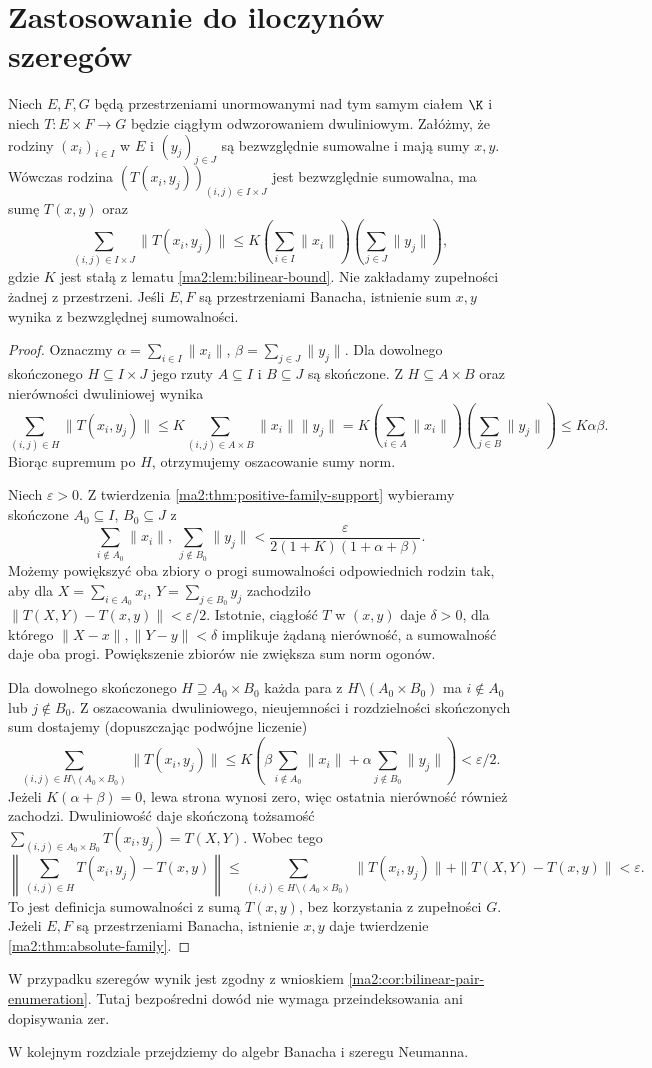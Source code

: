 \section{Zastosowanie do iloczynów szeregów}

\begin{twierdzenie}
\label{ma2:thm:bilinear-family-product}
Niech $E,F,G$ będą przestrzeniami unormowanymi nad
tym samym ciałem $\K$ i niech $T:E\times F\to G$
będzie ciągłym odwzorowaniem dwuliniowym. Załóżmy,
że rodziny $(x_i)_{i\in I}$ w $E$ i $(y_j)_{j\in J}$
są bezwzględnie sumowalne i mają sumy $x,y$.
Wówczas rodzina $(T(x_i,y_j))_{(i,j)\in I\times J}$
jest bezwzględnie sumowalna, ma sumę $T(x,y)$ oraz
\[
 \sum_{(i,j)\in I\times J}\|T(x_i,y_j)\|
 \le K\left(\sum_{i\in I}\|x_i\|\right)
       \left(\sum_{j\in J}\|y_j\|\right),
\]
gdzie $K$ jest stałą z lematu \ref{ma2:lem:bilinear-bound}.
Nie zakładamy zupełności żadnej z przestrzeni.
Jeśli $E,F$ są przestrzeniami Banacha, istnienie sum
$x,y$ wynika z bezwzględnej sumowalności.
\end{twierdzenie}
\begin{proof}
Oznaczmy $\alpha=\sum_{i\in I}\|x_i\|$,
$\beta=\sum_{j\in J}\|y_j\|$.
Dla dowolnego skończonego $H\subseteq I\times J$
jego rzuty $A\subseteq I$ i $B\subseteq J$ są skończone.
Z $H\subseteq A\times B$ oraz nierówności dwuliniowej
wynika
\[
 \sum_{(i,j)\in H}\|T(x_i,y_j)\|
 \le K\sum_{(i,j)\in A\times B}\|x_i\|\|y_j\|
 =K\left(\sum_{i\in A}\|x_i\|\right)
    \left(\sum_{j\in B}\|y_j\|\right)
 \le K\alpha\beta.
\]
Biorąc supremum po $H$, otrzymujemy oszacowanie
sumy norm.

Niech $\varepsilon>0$. Z twierdzenia
\ref{ma2:thm:positive-family-support} wybieramy
skończone $A_0\subseteq I$, $B_0\subseteq J$ z
\[
 \sum_{i\notin A_0}\|x_i\|,\ 
 \sum_{j\notin B_0}\|y_j\|
 <\frac{\varepsilon}{2(1+K)(1+\alpha+\beta)}.
\]
Możemy powiększyć oba zbiory o progi sumowalności
odpowiednich rodzin tak, aby dla
$X=\sum_{i\in A_0}x_i$, $Y=\sum_{j\in B_0}y_j$
zachodziło $\|T(X,Y)-T(x,y)\|<\varepsilon/2$.
Istotnie, ciągłość $T$ w $(x,y)$ daje $\delta>0$,
dla którego $\|X-x\|,\|Y-y\|<\delta$ implikuje
żądaną nierówność, a sumowalność daje oba progi.
Powiększenie zbiorów nie zwiększa sum norm ogonów.

Dla dowolnego skończonego $H\supseteq A_0\times B_0$
każda para z $H\setminus(A_0\times B_0)$ ma
$i\notin A_0$ lub $j\notin B_0$. Z oszacowania
dwuliniowego, nieujemności i rozdzielności skończonych
sum dostajemy (dopuszczając podwójne liczenie)
\[
 \sum_{(i,j)\in H\setminus(A_0\times B_0)}
       \|T(x_i,y_j)\|
 \le K\left(\beta\sum_{i\notin A_0}\|x_i\|
            +\alpha\sum_{j\notin B_0}\|y_j\|\right)
 <\varepsilon/2.
\]
Jeżeli $K(\alpha+\beta)=0$, lewa strona wynosi
zero, więc ostatnia nierówność również zachodzi.
Dwuliniowość daje skończoną tożsamość
$\sum_{(i,j)\in A_0\times B_0}T(x_i,y_j)=T(X,Y)$.
Wobec tego
\[
 \left\|\sum_{(i,j)\in H}T(x_i,y_j)-T(x,y)\right\|
 \le
 \sum_{(i,j)\in H\setminus(A_0\times B_0)}\|T(x_i,y_j)\|
 +\|T(X,Y)-T(x,y)\|<\varepsilon.
\]
To jest definicja sumowalności z sumą $T(x,y)$,
bez korzystania z zupełności $G$.
Jeżeli $E,F$ są przestrzeniami Banacha, istnienie
$x,y$ daje twierdzenie \ref{ma2:thm:absolute-family}.
\end{proof}

W przypadku szeregów wynik jest zgodny z wnioskiem
\ref{ma2:cor:bilinear-pair-enumeration}. Tutaj bezpośredni
dowód nie wymaga przeindeksowania ani dopisywania zer.

W kolejnym rozdziale przejdziemy do algebr Banacha
i szeregu Neumanna.
